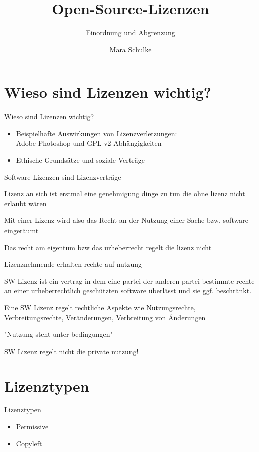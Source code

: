 \documentclass{beamer}
\title{Open-Source-Lizenzen}
\subtitle{Einordnung und Abgrenzung}
\author{Mara Schulke}
\begin{document}
\maketitle

\section{Wieso sind Lizenzen wichtig?}
\begin{frame}{Wieso sind Lizenzen wichtig?}
	\begin{itemize}
		\item Beispielhafte Auswirkungen von Lizenzverletzungen:\\
			Adobe Photoshop und GPL v2 Abhängigkeiten
		\vspace{2em}
		\item Ethische Grundsätze und soziale Verträge
	\end{itemize}
\end{frame}



Software-Lizenzen sind Lizenzverträge

Lizenz an sich ist erstmal eine genehmigung dinge zu tun die ohne lizenz nicht
erlaubt wären

Mit einer Lizenz wird also das Recht an der Nutzung einer Sache bzw. software eingeräumt

Das recht am eigentum bzw das urheberrecht regelt die lizenz nicht

Lizenznehmende erhalten rechte auf nutzung

SW Lizenz ist ein vertrag in dem eine partei der anderen partei bestimmte
rechte an einer urheberrechtlich geschützten software überlässt und sie ggf.
beschränkt.

Eine SW Lizenz regelt rechtliche Aspekte wie Nutzungsrechte, Verbreitungsrechte,
Veränderungen, Verbreitung von Änderungen

"Nutzung steht unter bedingungen"

SW Lizenz regelt nicht die private nutzung!



\section{Lizenztypen}
\begin{frame}{Lizenztypen}
	\begin{itemize}
		\item Permissive
		\item Copyleft
	\end{itemize}
\end{frame}
\end{document}
